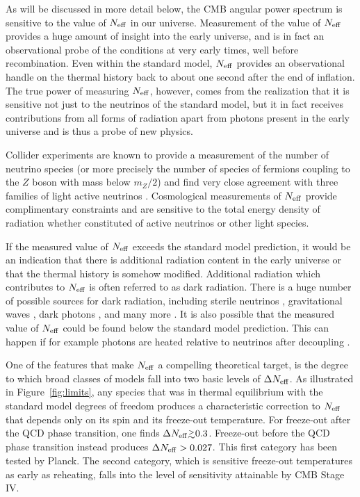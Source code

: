 As will be discussed in more detail below, the CMB angular power spectrum is sensitive to the value of $N_{\rm eff}$ in our universe.  Measurement of the value of $N_{\rm eff}$ provides a huge amount of insight into the early universe, and is in fact an observational probe of the conditions at very early times, well before recombination.  Even within the standard model, $N_{\rm eff}$ provides an observational handle on the thermal history back to about one second after the end of inflation.  The true power of measuring $N_{\rm eff}$, however, comes from the realization that it is sensitive not just to the neutrinos of the standard model, but it in fact receives contributions from all forms of radiation apart from photons present in the early universe and is thus a probe of new physics.

Collider experiments are known to provide a measurement of the number of neutrino species (or more precisely the number of species of fermions coupling to the $Z$ boson with mass below $m_Z/2$) and find very close agreement with three families of light active neutrinos \cite{ALEPH:2005ab}.  Cosmological measurements of $N_{\rm eff}$ provide complimentary constraints and are sensitive to the total energy density of radiation whether constituted of active neutrinos or other light species.

If the measured value of $N_{\rm eff}$ exceeds the standard model prediction, it would be an indication that there is additional radiation content in the early universe or that the thermal history is somehow modified.  Additional radiation which contributes to $N_{\rm eff}$ is often referred to as dark radiation.  There is a huge number of possible sources for dark radiation, including sterile neutrinos \cite{Abazajian:2001nj,Strumia:2006db,Boyarsky:2009ix}, gravitational waves \cite{Boyle:2007zx,Stewart:2007fu,Meerburg:2015zua}, dark photons \cite{Ackerman:mha,Kaplan:2011yj,CyrRacine:2012fz}, and many more \cite{Cadamuro:2010cz,Weinberg:2013kea}.  It is also possible that the measured value of $N_{\rm eff}$ could be found below the standard model prediction.  This can happen if for example photons are heated relative to neutrinos after decoupling \cite{Steigman:2013yua,Boehm:2013jpa}.

One of the features that make $N_{\rm eff}$ a compelling theoretical target, is the degree to which broad classes of models fall into two basic levels of $\Delta N_{\rm eff}$.  As illustrated in Figure~\ref{fig:limits}, any species that was in thermal equilibrium with the standard model degrees of freedom produces a characteristic correction to $N_{\rm eff}$ that depends only on its spin and its freeze-out temperature.  For freeze-out after the QCD phase transition, one finds $\Delta \Neff \gtrsim 0.3$.  Freeze-out before the QCD phase transition instead produces $\Delta N_{\rm eff} > 0.027$.  This first category has been tested by Planck.  The second category, which is sensitive freeze-out temperatures as early as reheating, falls into the level of sensitivity attainable by CMB Stage IV.

